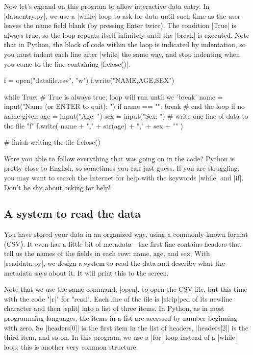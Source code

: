 \documentclass[11pt]{book}
\begin{document}
Now let's expand on this program to allow interactive data entry.  In |dataentry.py|, we use a |while| loop to ask for data until such time as the user leaves the name field blank (by pressing Enter twice).  The condition |True| is always true, so the loop repeats itself infinitely until the |break| is executed.  Note that in Python, the block of code within the loop is indicated by indentation, so you must indent each line after |while| the same way, and stop indenting when you come to the line containing |f.close()|.

\begin{pycode}
f = open("datafile.csv", "w")
f.write("NAME,AGE,SEX\n")

while True: 
    # True is always true; loop will run until we 'break'
    name = input("Name (or ENTER to quit): ")
    if name == "": break # end the loop if no name given
    age = input("Age: ")
    sex = input("Sex: ")
    # write one line of data to the file "f"
    f.write( name + "," + str(age) + "," + sex + "\n" )

# finish writing the file
f.close()
\end{pycode}

Were you able to follow everything that was going on in the code?  Python is pretty close to English, so sometimes you can just guess.  If you are struggling, you may want to search the Internet for help with the keywords |while| and |if|.  Don't be shy about asking for help!

\subsection*{A system to read the data}

You have stored your data in an organized way, using a commonly-known format (CSV).  It even has a little bit of metadata---the first line contains headers that tell us the names of the fields in each row: name, age, and sex.  With |readdata.py|, we design a system to read the data and describe what the metadata says about it.  It will print this to the screen.

Note that we use the same command, |open|, to open the CSV file, but this time with the code "|r|" for "read".  Each line of the file is |strip|ped of its newline character and then |split| into a list of three items.  In Python, as in most programming languages, the items in a list are accessed by number beginning with zero.  So |headers[0]| is the first item in the list of headers, |headers[2]| is the third item, and so on.  In this program, we use a |for| loop instead of a |while| loop; this is another very common structure.
\end{document}
